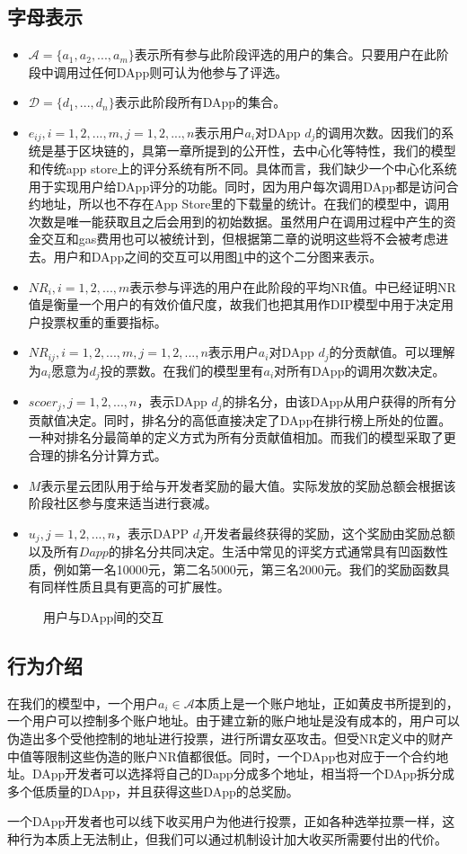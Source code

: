 \subsection{字母表示}
\begin{itemize}
	\item $\mathcal{A}=\{a_1,a_2,...,a_m\}$表示所有参与此阶段评选的用户的集合。只要用户在此阶段中调用过任何DApp则可认为他参与了评选。
	\item $\mathcal{D}=\{d_1,...,d_n\}$表示此阶段所有DApp的集合。
	\item $e_{ij},i=1,2,...,m, j=1,2,...,n$表示用户$a_i$对DApp $d_j$的调用次数。因我们的系统是基于区块链的，具第一章所提到的公开性，去中心化等特性，我们的模型和传统app store上的评分系统有所不同。具体而言，我们缺少一个中心化系统用于实现用户给DApp评分的功能。同时，因为用户每次调用DApp都是访问合约地址，所以也不存在App Store里的下载量的统计。在我们的模型中，调用次数是唯一能获取且之后会用到的初始数据。虽然用户在调用过程中产生的资金交互和gas费用也可以被统计到，但根据第二章的说明这些将不会被考虑进去。用户和DApp之间的交互可以用图\ref{fig:interact}中的这个二分图来表示。
	\item $NR_i, i=1,2,...,m$表示参与评选的用户在此阶段的平均NR值。\cite{Nabulasyellowpaper}中已经证明NR值是衡量一个用户的有效价值尺度，故我们也把其用作DIP模型中用于决定用户投票权重的重要指标。
	\item $NR_{ij}, i=1,2,...,m,j=1,2,...,n$表示用户$a_i$对DApp $d_j$的分贡献值。可以理解为$a_i$愿意为$d_j$投的票数。在我们的模型里有$a_i$对所有DApp的调用次数决定。
	\item $scoer_j, j=1,2,...,n$，表示DApp $d_j$的排名分，由该DApp从用户获得的所有分贡献值决定。同时，排名分的高低直接决定了DApp在排行榜上所处的位置。一种对排名分最简单的定义方式为所有分贡献值相加。而我们的模型采取了更合理的排名分计算方式。
	\item $M$表示星云团队用于给与开发者奖励的最大值。实际发放的奖励总额会根据该阶段社区参与度来适当进行衰减。
	\item $u_j, j=1,2,...,n$，表示DAPP $d_j$开发者最终获得的奖励，这个奖励由奖励总额以及所有$Dapp$的排名分共同决定。生活中常见的评奖方式通常具有凹函数性质，例如第一名10000元，第二名5000元，第三名2000元。我们的奖励函数具有同样性质且具有更高的可扩展性。
\end{itemize}

\begin{figure}
	\centering
  
\caption{用户与DApp间的交互 \label{fig:interact}}
\end{figure}
\subsection{行为介绍}
在我们的模型中，一个用户$a_i \in \mathcal{A}$本质上是一个账户地址，正如黄皮书所提到的，一个用户可以控制多个账户地址。由于建立新的账户地址是没有成本的，用户可以伪造出多个受他控制的地址进行投票，进行所谓女巫攻击。但受NR定义中的财产中值等限制这些伪造的账户NR值都很低。同时，一个DApp也对应于一个合约地址。DApp开发者可以选择将自己的Dapp分成多个地址，相当将一个DApp拆分成多个低质量的DApp，并且获得这些DApp的总奖励。

一个DApp开发者也可以线下收买用户为他进行投票，正如各种选举拉票一样，这种行为本质上无法制止，但我们可以通过机制设计加大收买所需要付出的代价。
